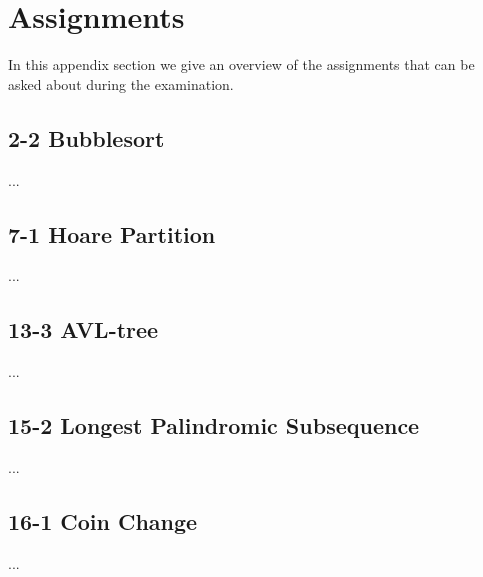 
\thispagestyle{fancyplain}

\chapter{Assignments}
In this appendix section we give an overview of the assignments that can be
asked about during the examination.

\section{2-2 Bubblesort}
\label{appendix:assignments|ass:bubblesort}
...

\section{7-1 Hoare Partition}
\label{appendix:assignments|ass:hoare-partition}
...

\section{13-3 AVL-tree}
\label{appendix:assignments|ass:avl-tree}
...

\section{15-2 Longest Palindromic Subsequence}
\label{appendix:assignments|ass:longest-palindromic-subsequence}
...

\section{16-1 Coin Change}
\label{appendix:assignments|ass:coin-change}
...

